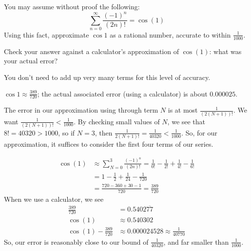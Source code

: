 \begin{Mquestion}
You may assume without proof the following:
\[\sum_{n=0}^\infty \frac{(-1)^n}{(2n)!} = \cos(1)\]
Using this fact, approximate $\cos 1$ as a rational number, accurate to within $\frac1{1000}$.

Check your answer against a calculator's approximation of $\cos(1)$: what was your actual error?
\end{Mquestion}
\begin{hint}
You don't need to add up very many terms for this level of accuracy.
\end{hint}
\begin{answer}
$\cos 1 \approx \frac{389}{720}$; the actual associated error (using a calculator) is about
$0.000025$.
\end{answer}
\begin{solution}
The error in our approximation using through term $N$ is at most $\frac{1}{(2(N+1))!}$. We want $\frac{1}{(2(N+1))!}<\frac{1}{1000}$. By checking small values of $N$, we see that $8!=40320>1000$, so if $N=3$, then $\frac{1}{2(N+1)!}=\frac{1}{40320}<\frac{1}{1000}$. So, for our approximation, it suffices to consider the first four terms of our series.

\begin{align*}
\cos(1)&\approx \sum_{N=0}^3 \frac{(-1)^n}{(2n)!} = \frac{1}{0!}-\frac{1}{2!}+\frac{1}{4!}-\frac{1}{6!}\\
&=1-\frac12+\frac{1}{24}-\frac{1}{720}\\
&=\frac{720-360+30-1}{720}=\frac{389}{720}
\end{align*}
When we use a calculator, we see
\begin{align*}
\frac{389}{720}&=0.5402\overline{77} \\
\cos(1)&\approx  0.540302\\
\cos(1) - \frac{389}{720}&\approx 0.000024528\approx \frac{1}{40770}
\end{align*}
So, our error is reasonably close to our bound of $\frac{1}{40320}$, and far smaller than $\frac{1}{1000}$.
\end{solution}







